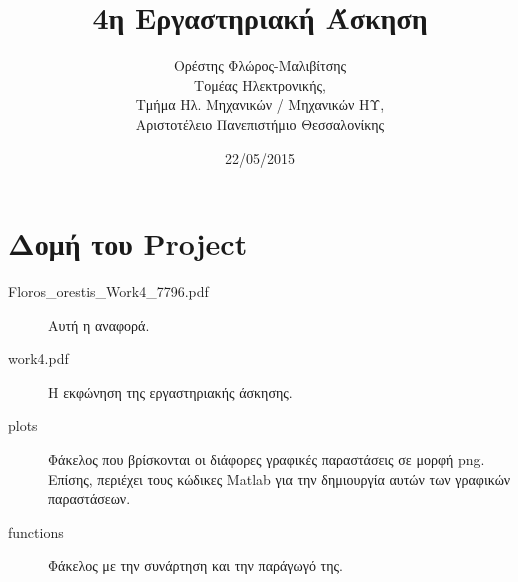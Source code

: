 \usepackage{enumerate}%

\usepackage{fontspec}
\setmainfont{DejaVu Serif}
\renewcommand{\contentsname}{Περιεχόμενα}
\renewcommand{\listfigurename}{Λίστα Σχημάτων}
\renewcommand{\figurename}{Σχήμα}



\title{4η Εργαστηριακή Άσκηση}
\author{Ορέστης Φλώρος-Μαλιβίτσης\\
  Τομέας Ηλεκτρονικής,\\
  Τμήμα Ηλ. Μηχανικών / Μηχανικών ΗΥ,\\
  Αριστοτέλειο Πανεπιστήμιο Θεσσαλονίκης}
\date{22/05/2015}





\maketitle
\tableofcontents
\listoffigures
\newpage


\chapter*{Δομή του Project} \label{project-structure}

\begin{description}
	\item[Floros\_orestis\_Work4\_7796.pdf] Αυτή η αναφορά.
	\item[work4.pdf] Η εκφώνηση της εργαστηριακής άσκησης.
	\item[plots] Φάκελος που βρίσκονται οι διάφορες γραφικές παραστάσεις σε μορφή png. Επίσης, περιέχει τους κώδικες Matlab για την δημιουργία αυτών των γραφικών παραστάσεων.
	\item[functions] Φάκελος με την συνάρτηση και την παράγωγό της.
\end{description}









